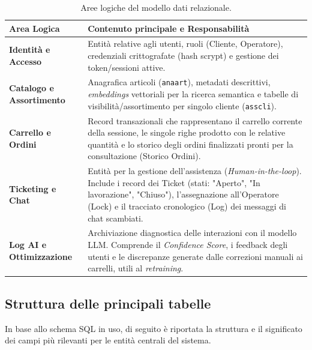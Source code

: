 \documentclass[a4paper, 11pt, oneside]{scrartcl}
\begin{document}
\begin{table}[H]
    \centering
    \renewcommand{\arraystretch}{1.5}
    \begin{tabularx}{\textwidth}{@{}lX@{}}
        \toprule
        \textbf{Area Logica} & \textbf{Contenuto principale e Responsabilità} \\
        \midrule
        \textbf{Identità e Accesso} & Entità relative agli utenti, ruoli (Cliente, Operatore), credenziali crittografate (hash scrypt) e gestione dei token/sessioni attive. \\
        \textbf{Catalogo e Assortimento} & Anagrafica articoli (\texttt{anaart}), metadati descrittivi, \textit{embeddings} vettoriali per la ricerca semantica e tabelle di visibilità/assortimento per singolo cliente (\texttt{asscli}). \\
        \textbf{Carrello e Ordini} & Record transazionali che rappresentano il carrello corrente della sessione, le singole righe prodotto con le relative quantità e lo storico degli ordini finalizzati pronti per la consultazione (Storico Ordini). \\
        \textbf{Ticketing e Chat} & Entità per la gestione dell'assistenza (\textit{Human-in-the-loop}). Include i record dei Ticket (stati: "Aperto", "In lavorazione", "Chiuso"), l'assegnazione all'Operatore (Lock) e il tracciato cronologico (Log) dei messaggi di chat scambiati. \\
        \textbf{Log AI e Ottimizzazione} & Archiviazione diagnostica delle interazioni con il modello LLM. Comprende il \textit{Confidence Score}, i feedback degli utenti e le discrepanze generate dalle correzioni manuali ai carrelli, utili al \textit{retraining}. \\
        \bottomrule
    \end{tabularx}
    \caption{Aree logiche del modello dati relazionale.}
\end{table}

\subsection{Struttura delle principali tabelle}
In base allo schema SQL in uso, di seguito è riportata la struttura e il significato dei campi più rilevanti per le entità centrali del sistema.
\end{document}
